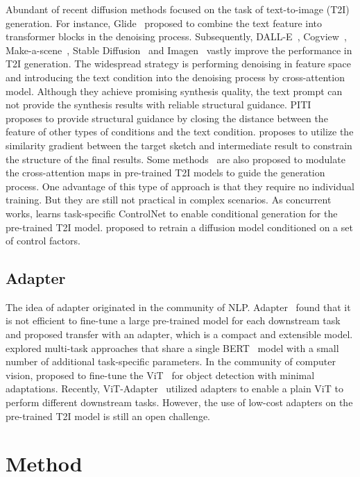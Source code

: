 Abundant of recent diffusion methods focused on the task of text-to-image (T2I) generation. For instance, Glide~\cite{glid} proposed to combine the text feature into transformer blocks in the denoising process. Subsequently, DALL-E~\cite{t2i2}, Cogview~\cite{t2i3}, Make-a-scene~\cite{gafni2022make}, Stable Diffusion~\cite{ldm} and Imagen~\cite{t2i1} vastly improve the performance in T2I generation. The widespread strategy is performing denoising in feature space and introducing the text condition into the denoising process by cross-attention model. Although they achieve promising synthesis quality, the text prompt can not provide the synthesis results with reliable structural guidance. PITI~\cite{piti} proposes to provide structural guidance by closing the distance between the feature of other types of conditions and the text condition. \cite{nvidia} proposes to utilize the similarity gradient between the target sketch and intermediate result to constrain the structure of the final results. Some methods~\cite{p2p,edit1,edit2} are also proposed to modulate the cross-attention maps in pre-trained T2I models to guide the generation process. One advantage of this type of approach is that they require no individual training. But they are still not practical in complex scenarios. As concurrent works, \cite{controlnet} learns task-specific ControlNet to enable conditional generation for the pre-trained T2I model. \cite{composer} proposed to retrain a diffusion model conditioned on a set of control factors. 

\subsection{Adapter}
The idea of adapter originated in the community of NLP. Adapter~\cite{adapter} found that it is not efficient to fine-tune a large pre-trained model for each downstream task and proposed transfer with an adapter, which is a compact and extensible model. \cite{pal} explored multi-task approaches that share a single BERT~\cite{bert} model with a small number of additional task-specific parameters. In the community of computer vision, \cite{plinvit} proposed to fine-tune the ViT~\cite{vit} for object detection with minimal adaptations. Recently, ViT-Adapter~\cite{vitadapter} utilized adapters to enable a plain ViT to perform different downstream tasks. However, the use of low-cost adapters on the pre-trained T2I model is still an open challenge.

\section{Method}
